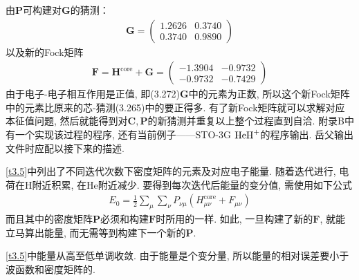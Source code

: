 由$\mathbf{P}$可构建对$\mathbf{G}$的猜测：
\begin{align}
	\mathbf{G}=\begin{pmatrix}
		1.2626&0.3740\\0.3740&0.9890
	\end{pmatrix}
\end{align}
以及新的Fock矩阵
\begin{align}
	\mathbf{F=H}^\mathrm{core}+\mathbf{G}=
	\begin{pmatrix}
		-1.3904&-0.9732 \\ -0.9732&-0.7429
	\end{pmatrix}
\end{align}
由于电子-电子相互作用是正值, 
即(3.272)$\mathbf{G}$中的元素为正数, 
所以这个新Fock矩阵中的元素比原来的芯-\ha 猜测(3.265)中的要正得多. 
有了新Fock矩阵就可以求解对应本征值问题, 
然后就能得到对$\mathbf{C,P}$的新猜测并重复以上整个过程直到自洽. 
附录B中有一个实现该过程的程序, 
还有当前例子——STO-3G $\mathrm{HeH}^+$的程序输出. 
岳父输出文件时应配以接下来的描述.


\autoref{t3.5}中列出了不同迭代次数下密度矩阵的元素及对应电子能量. 
随着迭代进行, 
电荷在$\mathrm{H}$附近积累, 
在$\mathrm{He}$附近减少. 
要得到每次迭代后能量的变分值, 
需使用如下公式
\begin{align}
	E_0 = \frac{1}{2}\sum_\mu\sum_\nu P_{\nu\mu}(H_{\mu\nu}^\mathrm{core}+F_{\mu\nu})
\end{align}
而且其中的密度矩阵$\mathbf{P}$必须和构建$\mathbf{F}$时所用的一样. 
如此, 
一旦构建了新的$\mathbf{F}$, 
就能立马算出能量, 
而无需等到构建下一个新的$\mathbf{P}$. 

\autoref{t3.5}中能量从高至低单调收敛. 由于能量是个变分量, 所以能量的相对误差要小于波函数和密度矩阵的. 

